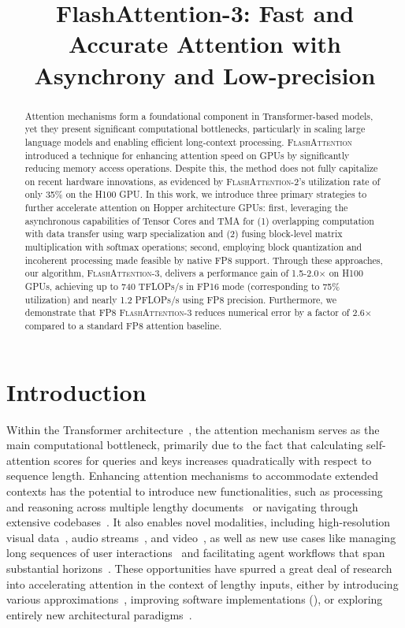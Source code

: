 \title{FlashAttention-3: Fast and Accurate Attention with Asynchrony and Low-precision}

\begin{abstract}
Attention mechanisms form a foundational component in Transformer-based models, yet they present significant computational bottlenecks, particularly in scaling large language models and enabling efficient long-context processing. \textsc{FlashAttention} introduced a technique for enhancing attention speed on GPUs by significantly reducing memory access operations. Despite this, the method does not fully capitalize on recent hardware innovations, as evidenced by \textsc{FlashAttention-2}'s utilization rate of only 35\% on the H100 GPU. In this work, we introduce three primary strategies to further accelerate attention on Hopper architecture GPUs: first, leveraging the asynchronous capabilities of Tensor Cores and TMA for (1) overlapping computation with data transfer using warp specialization and (2) fusing block-level matrix multiplication with softmax operations; second, employing block quantization and incoherent processing made feasible by native FP8 support. Through these approaches, our algorithm, \textsc{FlashAttention-3}, delivers a performance gain of 1.5-2.0$\times$ on H100 GPUs, achieving up to 740 TFLOPs/s in FP16 mode (corresponding to 75\% utilization) and nearly 1.2 PFLOPs/s using FP8 precision. Furthermore, we demonstrate that FP8 \textsc{FlashAttention-3} reduces numerical error by a factor of 2.6$\times$ compared to a standard FP8 attention baseline.
\end{abstract}

\section{Introduction}
\label{sec:intro}

Within the Transformer architecture~\citep{vaswani2017attention}, the attention mechanism serves as the main computational bottleneck, primarily due to the fact that calculating self-attention scores for queries and keys increases quadratically with respect to sequence length. Enhancing attention mechanisms to accommodate extended contexts has the potential to introduce new functionalities, such as processing and reasoning across multiple lengthy documents~\citep{guo2021longt5,shaham2022scrolls,peng2023yarn} or navigating through extensive codebases~\citep{roziere2023code, li2023starcoder}. It also enables novel modalities, including high-resolution visual data~\citep{chen2022scaling}, audio streams~\citep{gulati2020conformer}, and video~\citep{ho2022video}, as well as new use cases like managing long sequences of user interactions~\citep{sun2019bert4rec} and facilitating agent workflows that span substantial horizons~\citep{yao2022react}. These opportunities have spurred a great deal of research into accelerating attention in the context of lengthy inputs, either by introducing various approximations~\citep{katharopoulos2020transformers,choromanski2020rethinking,
tay2020efficient}, improving software implementations (\citep{rabe2021self,dao2022flashattention,kwon2023efficient}), or exploring entirely new architectural paradigms~\citep{peng2023rwkv,sun2023retentive,gu2023mamba}.

